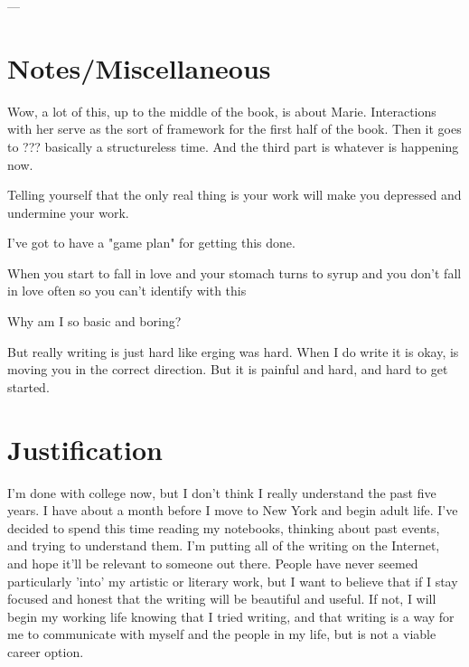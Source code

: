 \documentclass[12pt]{article}
\begin{document}
---

\section{Notes/Miscellaneous}
Wow, a lot of this, up to the middle of the book, is about Marie.  Interactions
with her serve as the sort of framework for the first half of the book.  Then it
goes to ???  basically a structureless time.  And the third part is whatever is
happening now.

Telling yourself that the only real thing is your work will make you depressed
and undermine your work.  

I've got to have a "game plan" for getting this done.

When you start to fall in love
and your stomach turns to syrup
and you don't fall in love often
so you can't identify with this

Why am I so basic and boring?

But really writing is just hard like erging was hard.  When I do write it is
okay, is moving you in the correct direction.  But it is painful and hard, and
hard to get started.

\section{Justification}
I'm done with college now, but I don't think I really understand the past five
years.  I have about a month before I move to New York and begin adult life.
I've decided to spend this time reading my notebooks, thinking about past
events, and trying to understand them.  I'm putting all of the writing on the
Internet, and hope it'll be relevant to someone out there.  People have never
seemed particularly 'into' my artistic or literary work, but I want to believe
that if I stay focused and honest that the writing will be beautiful and
useful.  If not, I will begin my working life knowing that I tried writing, and
that writing is a way for me to communicate with myself and the people in my
life, but is not a viable career option.
\end{document}
